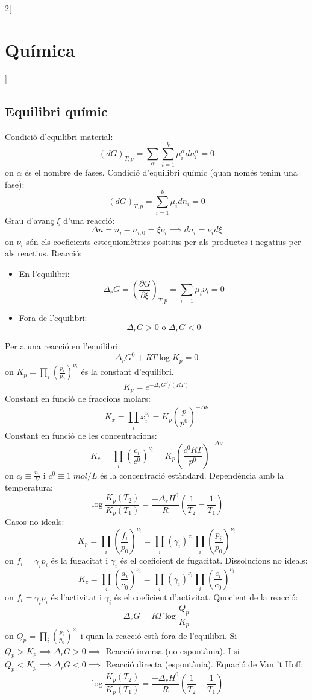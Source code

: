 \documentclass[class=article,10pt,crop=false]{standalone}
\begin{document}
\begin{multicols}{2}[\section{Química}]
\subsection{Equilibri químic}
Condició d'equilibri material:
$$(dG)_{T,p}=\sum_\alpha\sum_{i=1}^k\mu_i^\alpha dn_i^\alpha=0$$ {\footnotesize on $\alpha$ és el nombre de fases.}\newline
Condició  d'equilibri químic (quan només tenim una fase): $$(dG)_{T,p}=\sum_{i=1}^k\mu_idn_i=0$$
Grau d'avanç $\xi$ d'una reacció: $$\Delta n=n_i-n_{i,0}=\xi\nu_i\implies dn_i=\nu_id\xi$$ {\footnotesize on $\nu_i$ són els coeficients estequiomètrics positius per als productes i negatius per als reactius.}\newline
Reacció:
\begin{itemize}
    \item En l'equilibri: $$\Delta_rG=\left(\frac{\partial G}{\partial \xi}\right)_{T,p}=\sum_{i=1}\mu_i\nu_i=0$$
    \item Fora de l'equilibri: $$\Delta_rG>0\text{  o  }\Delta_rG<0$$
\end{itemize}
Per a una reacció en l'equilibri: $$\Delta_rG^0+RT\log K_p=0$$ {\footnotesize on $K_p=\prod_i\left(\frac{p_i}{p_0}\right)^{\nu_i}$ és la constant d'equilibri.}
$$K_p=e^{-\Delta_rG^0/(RT)}$$
Constant en funció de fraccions molars: $$K_x=\prod_ix_i^{\nu_i}=K_p\left(\frac{p}{p^0}\right)^{-\Delta\nu}$$
Constant en funció de les concentracions: $$K_c=\prod_i\left(\frac{c_i}{c^0}\right)^{\nu_i}=K_p\left(\frac{c^0RT}{p^0}\right)^{-\Delta\nu}$$ {\footnotesize on $c_i\equiv\frac{n_i}{V}$ i $c^0\equiv1\;mol/L$ és la concentració estàndard.}\newline
Dependència amb la temperatura: $$\log\frac{K_p(T_2)}{K_p(T_1)}=\frac{-\Delta_rH^0}{R}\left(\frac{1}{T_2}-\frac{1}{T_1}\right)$$
Gasos no ideals:
$$K_p=\prod_i\left(\frac{f_i}{p_0}\right)^{\nu_i}=\prod_i(\gamma_i)^{\nu_i}\prod_i\left(\frac{p_i}{p_0}\right)^{\nu_i}$$ {\footnotesize on $f_i=\gamma_ip_i$ és la fugacitat i $\gamma_i$ és el coeficient de fugacitat.}\newline
Dissolucions no ideals:
$$K_c=\prod_i\left(\frac{a_i}{c_0}\right)^{\nu_i}=\prod_i(\gamma_i)^{\nu_i}\prod_i\left(\frac{c_i}{c_0}\right)^{\nu_i}$$ {\footnotesize on $f_i=\gamma_ip_i$ és l'activitat i $\gamma_i$ és el coeficient d'activitat.}\newline
Quocient de la reacció: $$\Delta_rG=RT\log\frac{Q_p}{K_p}$$ {\footnotesize on $Q_p=\prod_i\left(\frac{p_i}{p_0}\right)^{\nu_i}$ i quan la reacció està fora de l'equilibri. Si $Q_p>K_p\implies\Delta_rG>0\implies$ Reacció inversa (no espontània). I si $Q_p<K_p\implies\Delta_rG<0\implies$ Reacció directa (espontània).}
Equació de Van 't Hoff: $$\log\frac{K_p(T_2)}{K_p(T_1)}=\frac{-\Delta_rH^0}{R}\left(\frac{1}{T_2}-\frac{1}{T_1}\right)$$

\end{multicols}
\end{document}
